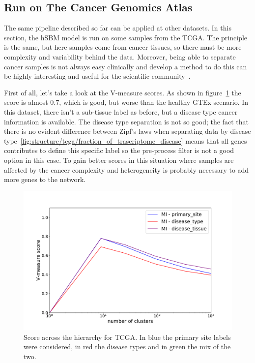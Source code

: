 \subsection{Run on The Cancer Genomics Atlas}
The same pipeline described so far can be applied at other datasets. In this section, the hSBM model is run on some samples from the TCGA. The principle is the same, but here samples come from cancer tissues, so there must be more complexity and variability behind the data. Moreover, being able to separate cancer samples is not always easy clinically and develop a method to do this can be highly interesting and useful for the scientific community~\cite{Farver2018}. 

First of all, let's take a look at the V-measure scores. As shown in figure~\ref{fig:topic/tcga/metric} the score is almost $0.7$, which is good, but worse than the healthy GTEx scenario. In this dataset, there isn't a sub-tissue label as before, but a disease type cancer information is available. The disease type separation is not so good; the fact that there is no evident difference between Zipf's laws when separating data by disease type~\ref{fig:structure/tcga/fraction_of_trascriptome_disease} means that all genes contributes to define this specific label so the pre-process filter is not a good option in this case. To gain better scores in this situation where samples are affected by the cancer complexity and heterogeneity is probably necessary to add more genes to the network.
\begin{figure}[htb!]
    \centering
    \includegraphics[width=0.8\linewidth]{pictures/topic/tcga/metric.pdf}
    \caption{Score across the hierarchy for TCGA. In blue the primary site labels were considered, in red the disease types and in green the mix of the two.}
    \label{fig:topic/tcga/metric}
\end{figure}

